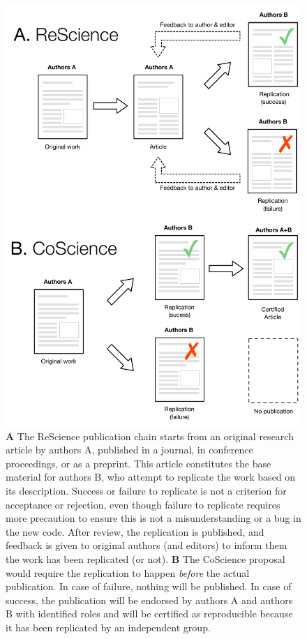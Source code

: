 \documentclass[11pt]{article}
\begin{document}
\begin{figure}
  \begin{center}
  \includegraphics[width=0.75\columnwidth]{CoScience}
  \caption{\textbf{A} The ReScience publication chain starts from an
    original research article by authors A, published in a journal, in
    conference proceedings, or as a preprint. This article constitutes
    the base material for authors B, who attempt to replicate the work
    based on its description. Success or failure to replicate is not a
    criterion for acceptance or rejection, even though failure to
    replicate requires more precaution to ensure this is not a
    misunderstanding or a bug in the new code. After review, the
    replication is published, and feedback is given to original
    authors (and editors) to inform them the work has been replicated
    (or not). \textbf{B} The CoScience proposal would require the
    replication to happen \textit{before} the actual publication. In
    case of failure, nothing will be published. In case of success,
    the publication will be endorsed by authors A and authors B with
    identified roles and will be certified as reproducible because it
    has been replicated by an independent group.}
  \label{fig:coscience}
  \end{center}
\end{figure}
\end{document}
